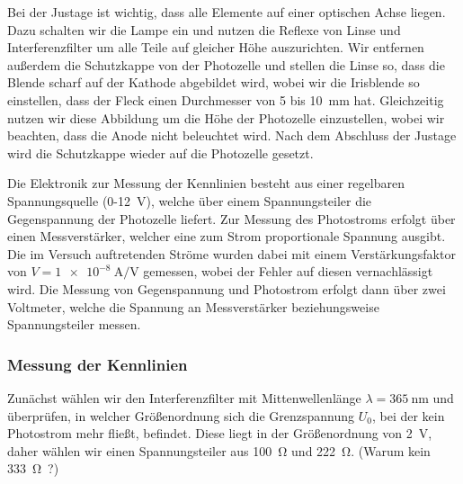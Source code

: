 \documentclass[11pt, a4paper]{article}
\numberwithin{equation}{section}
\begin{document}
Bei der Justage ist wichtig, dass alle Elemente auf einer optischen Achse liegen.
Dazu schalten wir die Lampe ein und nutzen die Reflexe von Linse und Interferenzfilter um alle Teile auf gleicher Höhe auszurichten.
Wir entfernen außerdem die Schutzkappe von der Photozelle und stellen die Linse so, dass die Blende scharf auf der Kathode abgebildet wird, wobei wir die Irisblende so einstellen, dass der Fleck einen Durchmesser von \num{5} bis \SI{10}{\milli\metre} hat.
Gleichzeitig nutzen wir diese Abbildung um die Höhe der Photozelle einzustellen, wobei wir beachten, dass die Anode nicht beleuchtet wird.
Nach dem Abschluss der Justage wird die Schutzkappe wieder auf die Photozelle gesetzt.

Die Elektronik zur Messung der Kennlinien besteht aus einer regelbaren Spannungsquelle (\num{0}-\SI{12}{\volt}), welche über einem Spannungsteiler die Gegenspannung der Photozelle liefert.
Zur Messung des Photostroms erfolgt über einen Messverstärker, welcher eine zum Strom proportionale Spannung ausgibt.
Die im Versuch auftretenden Ströme wurden dabei mit einem Verstärkungsfaktor von $V = \SI{1e-8}{\ampere\per\volt}$ gemessen, wobei der Fehler auf diesen vernachlässigt wird.
Die Messung von Gegenspannung und Photostrom erfolgt dann über zwei Voltmeter, welche die Spannung an Messverstärker beziehungsweise Spannungsteiler messen.

\subsubsection{Messung der Kennlinien}
Zunächst wählen wir den Interferenzfilter mit Mittenwellenlänge $\lambda = \SI{365}{\nano\metre}$ und überprüfen, in welcher Größenordnung sich die Grenzspannung $U_0$, bei der kein Photostrom mehr fließt, befindet.
Diese liegt in der Größenordnung von \SI{2}{\volt}, daher wählen wir einen Spannungsteiler aus \SI{100}{\ohm} und \SI{222}{\ohm}.
(Warum kein \SI{333}{\ohm ?})
\end{document}

